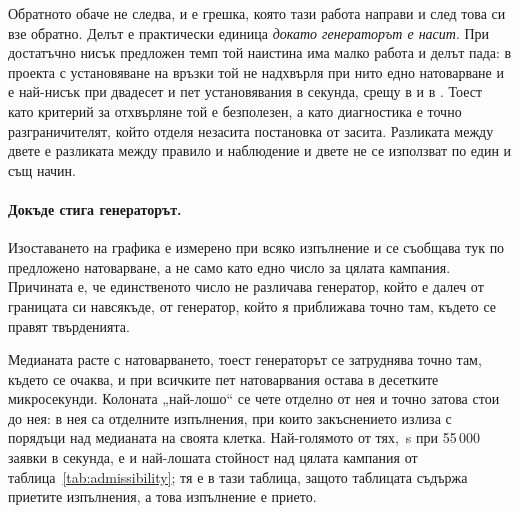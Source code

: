 Обратното обаче не следва, и е грешка, която тази работа направи и след това си взе обратно.
Делът е практически единица \emph{докато генераторът е насит}. При достатъчно нисък
предложен темп той наистина има малко работа и делът пада: в проекта с установяване на
връзки той не надхвърля  при нито едно натоварване и е
най-нисък при двадесет и пет установявания в секунда, срещу  в
 и  в . Тоест като критерий
за отхвърляне той е безполезен, а като диагностика е точно разграничителят, който отделя
незасита постановка от засита. Разликата между двете е разликата между правило и наблюдение и
двете не се използват по един и същ начин.

\paragraph{Докъде стига генераторът.} Изоставането на графика е измерено при всяко изпълнение
и се съобщава тук по предложено натоварване, а не само като едно число за цялата кампания.
Причината е, че единственото число не различава генератор, който е далеч от границата си
навсякъде, от генератор, който я приближава точно там, където се правят твърденията.


Медианата расте с натоварването, тоест генераторът се затруднява точно там, където се
очаква, и при всичките пет натоварвания остава в десетките микросекунди. Колоната „най-лошо“
се чете отделно от нея и точно затова стои до нея: в нея са отделните изпълнения, при които
закъснението излиза с порядъци над медианата на своята клетка. Най-голямото от
тях, \,\textmu s при 55\,000 заявки в секунда, е и най-лошата
стойност над цялата кампания от таблица~\ref{tab:admissibility}; тя е в тази таблица, защото
таблицата съдържа приетите изпълнения, а това изпълнение е прието.

